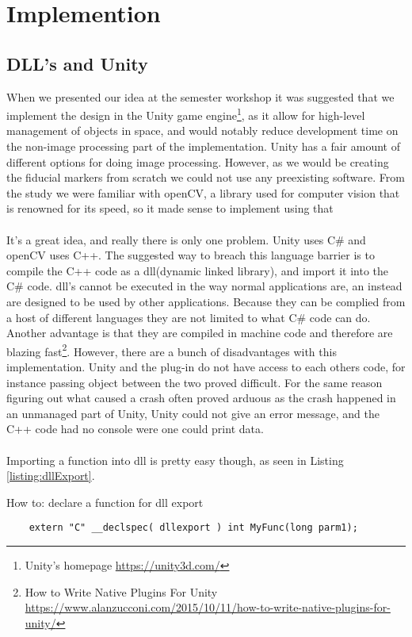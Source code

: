 \chapter{Implemention}
	\section{DLL's and Unity}
		When we presented our idea at the semester workshop it was suggested that we implement the design in the Unity game engine\footnote{Unity's homepage \url{https://unity3d.com/}}, as it allow for high-level management of objects in space, and would notably reduce development time on the non-image processing part of the implementation. Unity has a fair amount of different options for doing image processing. However, as we would be creating the fiducial markers from scratch we could not use any preexisting software. From the study we were familiar with openCV, a library used for computer vision that is renowned for its speed, so it made sense to implement using that\\\\
		It's a great idea, and really there is only one problem. Unity uses C\# and openCV uses C++. The suggested way to breach this language barrier is to compile the C++ code as a dll(dynamic linked library), and import it into the C\# code. dll's  cannot be executed in the way normal applications are, an instead are designed to be used by other applications. Because they can be complied from a host of different languages they are not limited to what C\# code can do. Another advantage is that they are compiled in machine code and therefore are blazing fast\footnote{How to Write Native Plugins For Unity \url{https://www.alanzucconi.com/2015/10/11/how-to-write-native-plugins-for-unity/}}. However, there are a bunch of disadvantages with this implementation. Unity and the plug-in do not have access to each others code, for instance passing object between the two proved difficult. For the same reason figuring out what caused a crash often proved arduous as the crash happened in an unmanaged part of Unity, Unity could not give an error message, and the C++ code had no console were one could print data.\\\\
		Importing a function into dll is pretty easy though, as seen in Listing \ref{listing:dllExport}.
\begin{listing}[H]
	\caption{How to: declare a function for dll export}
	\label{listing:dllExport}
	\begin{verbatim}
	extern "C" __declspec( dllexport ) int MyFunc(long parm1);
	\end{verbatim}
\end{listing}
